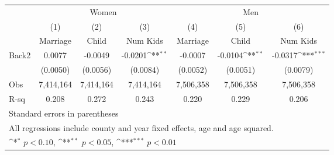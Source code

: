 \begin{table}[htbp]\centering
\def\sym#1{\ifmmode^{#1}\else\(^{#1}\)\fi}
\scriptsize
\begin{tabular}{l*{6}{c}}
\hline\hline
            &\multicolumn{3}{c}{Women}                                        &\multicolumn{3}{c}{Men}                                          \\\cmidrule(lr){2-4}\cmidrule(lr){5-7}
            &\multicolumn{1}{c}{(1)}&\multicolumn{1}{c}{(2)}&\multicolumn{1}{c}{(3)}&\multicolumn{1}{c}{(4)}&\multicolumn{1}{c}{(5)}&\multicolumn{1}{c}{(6)}\\
            &\multicolumn{1}{c}{Marriage}&\multicolumn{1}{c}{Child}&\multicolumn{1}{c}{Num Kids}&\multicolumn{1}{c}{Marriage}&\multicolumn{1}{c}{Child}&\multicolumn{1}{c}{Num Kids}\\
\hline
Back2&      0.0077         &     -0.0049         &     -0.0201\sym{**} &     -0.0007         &     -0.0104\sym{**} &     -0.0317\sym{***}\\
            &    (0.0050)         &    (0.0056)         &    (0.0084)         &    (0.0052)         &    (0.0051)         &    (0.0079)         \\
\hline
Obs&   7,414,164         &   7,414,164         &   7,414,164         &   7,506,358         &   7,506,358         &   7,506,358         \\
R-sq  &       0.208         &       0.272         &       0.243         &       0.220         &       0.229         &       0.206         \\
\hline\hline
\multicolumn{7}{l}{\footnotesize Standard errors in parentheses}\\
\multicolumn{7}{l}{\footnotesize All regressions include county and year fixed effects, age and age squared.}\\
\multicolumn{7}{l}{\footnotesize \sym{*} \(p<0.10\), \sym{**} \(p<0.05\), \sym{***} \(p<0.01\)}\\
\end{tabular}
\end{table}
